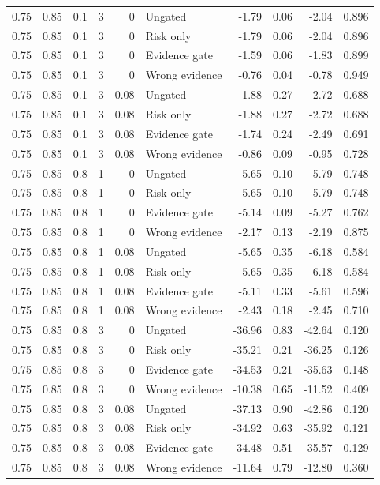 \begin{longtable}{rrrrrlrrrr}
0.75 & 0.85 & 0.1 & 3 & 0 & Ungated & -1.79 & 0.06 & -2.04 & 0.896\\
0.75 & 0.85 & 0.1 & 3 & 0 & Risk only & -1.79 & 0.06 & -2.04 & 0.896\\
0.75 & 0.85 & 0.1 & 3 & 0 & Evidence gate & -1.59 & 0.06 & -1.83 & 0.899\\
0.75 & 0.85 & 0.1 & 3 & 0 & Wrong evidence & -0.76 & 0.04 & -0.78 & 0.949\\
0.75 & 0.85 & 0.1 & 3 & 0.08 & Ungated & -1.88 & 0.27 & -2.72 & 0.688\\
0.75 & 0.85 & 0.1 & 3 & 0.08 & Risk only & -1.88 & 0.27 & -2.72 & 0.688\\
0.75 & 0.85 & 0.1 & 3 & 0.08 & Evidence gate & -1.74 & 0.24 & -2.49 & 0.691\\
0.75 & 0.85 & 0.1 & 3 & 0.08 & Wrong evidence & -0.86 & 0.09 & -0.95 & 0.728\\
0.75 & 0.85 & 0.8 & 1 & 0 & Ungated & -5.65 & 0.10 & -5.79 & 0.748\\
0.75 & 0.85 & 0.8 & 1 & 0 & Risk only & -5.65 & 0.10 & -5.79 & 0.748\\
0.75 & 0.85 & 0.8 & 1 & 0 & Evidence gate & -5.14 & 0.09 & -5.27 & 0.762\\
0.75 & 0.85 & 0.8 & 1 & 0 & Wrong evidence & -2.17 & 0.13 & -2.19 & 0.875\\
0.75 & 0.85 & 0.8 & 1 & 0.08 & Ungated & -5.65 & 0.35 & -6.18 & 0.584\\
0.75 & 0.85 & 0.8 & 1 & 0.08 & Risk only & -5.65 & 0.35 & -6.18 & 0.584\\
0.75 & 0.85 & 0.8 & 1 & 0.08 & Evidence gate & -5.11 & 0.33 & -5.61 & 0.596\\
0.75 & 0.85 & 0.8 & 1 & 0.08 & Wrong evidence & -2.43 & 0.18 & -2.45 & 0.710\\
0.75 & 0.85 & 0.8 & 3 & 0 & Ungated & -36.96 & 0.83 & -42.64 & 0.120\\
0.75 & 0.85 & 0.8 & 3 & 0 & Risk only & -35.21 & 0.21 & -36.25 & 0.126\\
0.75 & 0.85 & 0.8 & 3 & 0 & Evidence gate & -34.53 & 0.21 & -35.63 & 0.148\\
0.75 & 0.85 & 0.8 & 3 & 0 & Wrong evidence & -10.38 & 0.65 & -11.52 & 0.409\\
0.75 & 0.85 & 0.8 & 3 & 0.08 & Ungated & -37.13 & 0.90 & -42.86 & 0.120\\
0.75 & 0.85 & 0.8 & 3 & 0.08 & Risk only & -34.92 & 0.63 & -35.92 & 0.121\\
0.75 & 0.85 & 0.8 & 3 & 0.08 & Evidence gate & -34.48 & 0.51 & -35.57 & 0.129\\
0.75 & 0.85 & 0.8 & 3 & 0.08 & Wrong evidence & -11.64 & 0.79 & -12.80 & 0.360\\
\end{longtable}\endgroup